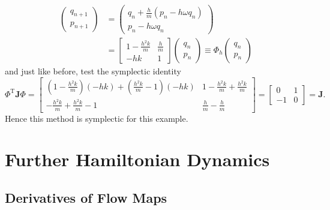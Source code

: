 \begin{equation*}
	\begin{aligned}
		\begin{pmatrix}
			q_{n+1} \\
			p_{n+1} 
		\end{pmatrix} &= \begin{pmatrix}
			q_{n} + \frac{h}{m} \left( p_{n} - h \omega q_n \right) \\
			p_{n} - h \omega q_n
		\end{pmatrix} \\
		&= \begin{bmatrix}
			1 - \frac{h^2 k}{m} & \frac{h}{m} \\
			-hk & 1
		\end{bmatrix} \begin{pmatrix}
			q_n \\
			p_n
		\end{pmatrix} \equiv \Phi_h \begin{pmatrix}
			q_n \\
			p_n
		\end{pmatrix}
	\end{aligned}
\end{equation*}
and just like before, test the symplectic identity
\begin{equation*}
	\Phi^\mathrm{T}\mathbf{J}\Phi = \begin{bmatrix}
		\left(1-\frac{h^2 k}{m}\right)(-hk) + \left(\frac{h^2 k}{m}-1\right)(-hk) & 1 - \frac{h^2 k}{m} + \frac{h^2 k}{m} \\
		-\frac{h^2 k}{m} + \frac{h^2 k}{m} -1 & \frac{h}{m} - \frac{h}{m}
	\end{bmatrix} = \begin{bmatrix}
		0 & 1 \\
		-1 & 0
	\end{bmatrix} = \mathbf{J}.
\end{equation*}
Hence this method is symplectic for this example.

\section{Further Hamiltonian Dynamics}

\subsection{Derivatives of Flow Maps}

